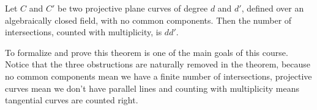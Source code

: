 \begin{theorem}
Let $C$ and $C'$ be two projective plane curves of degree $d$ and $d'$, defined over an algebraically closed field, with no common components. Then the number of intersections, counted with multiplicity, is $dd'$.
\end{theorem}

To formalize and prove this theorem is one of the main goals of this course. Notice that the three obstructions are naturally removed in the theorem, because no common components mean we have a finite number of intersections, projective curves mean we don't have parallel lines and counting with multiplicity means tangential curves are counted right.